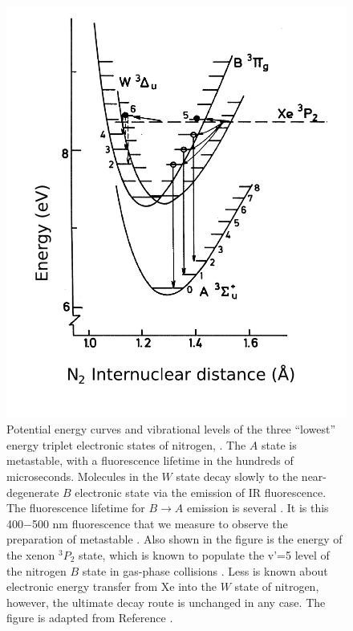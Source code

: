 \documentclass[12pt]{mitthesis}
\begin{document}
\begin{figure}
  \caption{Potential energy curves and vibrational levels of the three
    ``lowest'' energy triplet electronic states of nitrogen, .
    The $A$ state is metastable, with a fluorescence lifetime in the
    hundreds of microseconds.  Molecules in the $W$ state decay slowly
    to the near-degenerate $B$ electronic state via the emission of IR
    fluorescence.  The fluorescence lifetime for $B \rightarrow A$
    emission is several \microsec. It is this 400$-$500 nm
    fluorescence that we measure to observe the preparation of
    metastable .  Also shown in the figure is the energy of the
    xenon $^3P_2$ state, which is known to populate the v'=5 level of
    the nitrogen $B$ state in gas-phase collisions
    \cite{ottinger7890}.  Less is known about electronic energy
    transfer from Xe into the $W$ state of nitrogen, however, the
    ultimate decay route is unchanged in any case.  The figure is
    adapted from Reference \cite{krumpelmann-thesis}.}
  \label{fig:n2curves}
  \centering
  \includegraphics[width=5in]{n2curves.pdf}
\end{figure}
\end{document}
